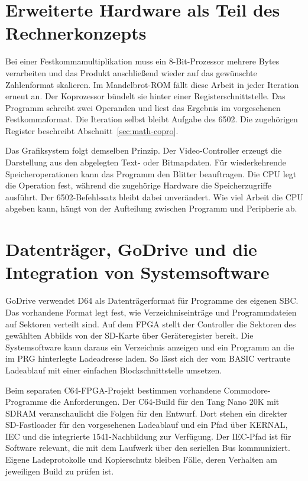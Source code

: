 \documentclass[fontsize=10.2bp,DIV=calc,oneside,open=any,headings=normal,numbers=noenddot]{scrbook}
\begin{document}
\section{Erweiterte Hardware als Teil des Rechnerkonzepts}

Bei einer Festkommamultiplikation muss ein 8-Bit-Prozessor mehrere Bytes
verarbeiten und das Produkt anschließend wieder auf das gewünschte
Zahlenformat skalieren. Im Mandelbrot-ROM fällt diese Arbeit in jeder
Iteration erneut an. Der Koprozessor bündelt sie hinter einer
Registerschnittstelle. Das Programm schreibt zwei Operanden und liest
das Ergebnis im vorgesehenen Festkommaformat. Die Iteration selbst
bleibt Aufgabe des 6502. Die zugehörigen Register beschreibt
Abschnitt~\ref{sec:math-copro}.

Das Grafiksystem folgt demselben Prinzip. Der Video-Controller erzeugt
die Darstellung aus den abgelegten Text- oder Bitmapdaten. Für
wiederkehrende Speicheroperationen kann das Programm den Blitter
beauftragen. Die CPU legt die Operation fest, während die zugehörige
Hardware die Speicherzugriffe ausführt. Der 6502-Befehlssatz bleibt dabei
unverändert. Wie viel Arbeit die CPU abgeben kann, hängt von der
Aufteilung zwischen Programm und Peripherie ab.

\section{Datenträger, GoDrive und die Integration von Systemsoftware}

GoDrive verwendet D64 als Datenträgerformat für Programme des eigenen
SBC. Das vorhandene Format legt fest, wie Verzeichniseinträge und
Programmdateien auf Sektoren verteilt sind. Auf dem FPGA stellt der
Controller die Sektoren des gewählten Abbilds von der SD-Karte über
Geräteregister bereit. Die Systemsoftware kann daraus ein Verzeichnis
anzeigen und ein Programm an die im PRG hinterlegte Ladeadresse laden.
So lässt sich der vom BASIC vertraute Ladeablauf mit einer einfachen
Blockschnittstelle umsetzen.

Beim separaten C64-FPGA-Projekt bestimmen vorhandene Commodore-Programme
die Anforderungen. Der C64-Build für den Tang Nano 20K mit SDRAM
veranschaulicht die Folgen für den Entwurf. Dort stehen ein direkter
SD-Fastloader für den vorgesehenen Ladeablauf und ein Pfad über
KERNAL, IEC und die integrierte 1541-Nachbildung zur Verfügung. Der
IEC-Pfad ist für Software relevant, die mit dem Laufwerk über den
seriellen Bus kommuniziert. Eigene Ladeprotokolle und Kopierschutz
bleiben Fälle, deren Verhalten am jeweiligen Build zu prüfen ist.
\end{document}
